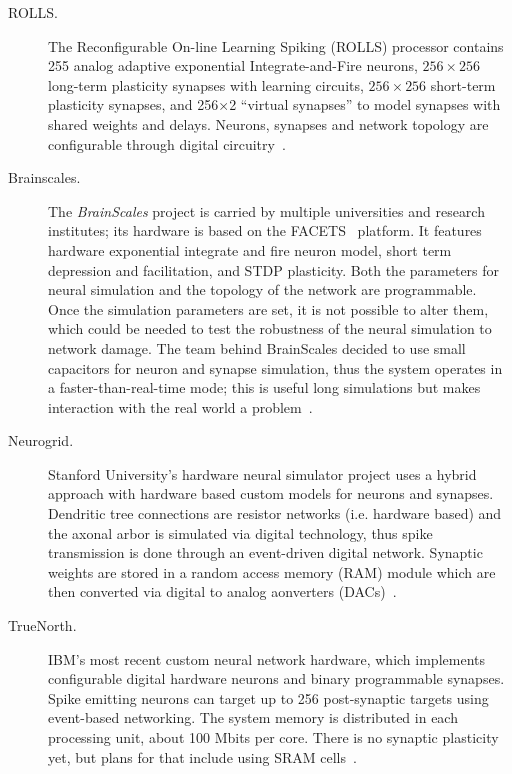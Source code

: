 \begin{description}
  
\item[ROLLS.] The Reconfigurable On-line Learning Spiking (ROLLS) processor contains 255 analog adaptive exponential Integrate-and-Fire neurons, $256\times 256$ long-term plasticity synapses with learning circuits, $256\times 256$ short-term plasticity synapses, and 256×2 ``virtual synapses'' to model synapses with shared weights and delays. Neurons, synapses and network topology are configurable through digital circuitry~\cite{rolls-processor}.

\item[Brainscales.] The \emph{BrainScales} project is carried by multiple universities and research institutes; its hardware is based on the FACETS~ platform\cite{brainscales-schemmel2010wafer}. It features hardware exponential integrate and fire neuron model, short term depression and facilitation, and STDP plasticity. Both the parameters for neural simulation and the topology of the network are programmable. Once the simulation parameters are set, it is not possible to alter them, which could be needed to test the robustness of the neural simulation to network damage. The team behind BrainScales decided to use small capacitors for neuron and synapse simulation, thus the system operates in a faster-than-real-time mode; this is useful long simulations but makes interaction with the real world a problem~\cite{neuro-platforms-summary-7159144,brainscales-homepage}. 

\item[Neurogrid.] Stanford University's hardware neural simulator project uses a hybrid approach with hardware based custom models for neurons and synapses. Dendritic tree connections are resistor networks (i.e. hardware based) and the axonal arbor is simulated via  digital technology, thus spike transmission is done through an event-driven digital network. Synaptic weights are stored in a random access memory (RAM) module which are then converted via  digital to analog aonverters (DACs)~\cite{neurogrid-6805187}. 

\item[TrueNorth.] IBM's most recent custom neural network hardware, which implements configurable digital hardware neurons and binary programmable synapses. Spike emitting neurons can target up to 256 post-synaptic targets using event-based networking. The system memory is distributed in each processing unit, about 100 Mbits per core. There is no synaptic plasticity yet, but plans for that include using SRAM cells~\cite{truenorth-web}. 


\end{description}
